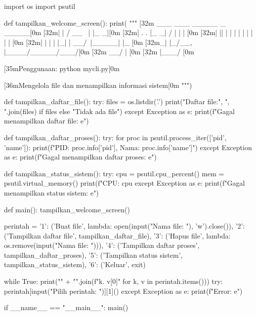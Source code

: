 \documentclass[12pt]{article}
\begin{document}
\begin{python}
    import os
    import psutil
    
    def tampilkan_welcome_screen():
        print(
            """
        [32m ___  ___      _____ _     _____[0m
        [32m|  \/  |     /  __ \ |   |_   _|[0m
        [32m| .  . |_   _| /  \/ |     | |  [0m
        [32m| |\/| | | | | |   | |     | |  [0m
        [32m| |  | | |_| | \__/\ |_____| |_ [0m
        [32m\_|  |_/\__, |\____/\_____/\___/[0m
        [32m         __/ |                  [0m
        [32m        |___/                   [0m
    
        [35mPenggunaan: python mycli.py[0m
    
        [36mMengelola file dan menampilkan informasi sistem[0m
        """)
    
    def tampilkan_daftar_file():
        try:
            files = os.listdir('.')
            print("Daftar file:", ", ".join(files) if files else "Tidak ada file")
        except Exception as e:
            print(f"Gagal menampilkan daftar file: {e}")
    
    def tampilkan_daftar_proses():
        try:
            for proc in psutil.process_iter(['pid', 'name']):
                print(f"PID: {proc.info['pid']}, Nama: {proc.info['name']}")
        except Exception as e:
            print(f"Gagal menampilkan daftar proses: {e}")
    
    def tampilkan_status_sistem():
        try:
            cpu = psutil.cpu_percent()
            mem = psutil.virtual_memory()
            print(f"CPU: {cpu}%
        except Exception as e:
            print(f"Gagal menampilkan status sistem: {e}")
    
    def main():
        tampilkan_welcome_screen()
        
        perintah = {
            '1': ('Buat file', 
                    lambda: open(input("Nama file: "), 'w').close()),
            '2': ('Tampilkan daftar file', 
                    tampilkan_daftar_file),
            '3': ('Hapus file', 
                    lambda: os.remove(input("Nama file: "))),
            '4': ('Tampilkan daftar proses', 
                    tampilkan_daftar_proses),
            '5': ('Tampilkan status sistem', 
                    tampilkan_status_sistem),
            '6': ('Keluar', 
                    exit)
        }
        
        while True:
            print("\n" + "\n".join(f"{k}. {v[0]}" for k, v in perintah.items()))
            try:
                perintah[input("Pilih perintah: ")][1]()
            except Exception as e:
                print(f"Error: {e}")
    
    if __name__ == "__main__":
        main()
\end{python}
\end{document}
